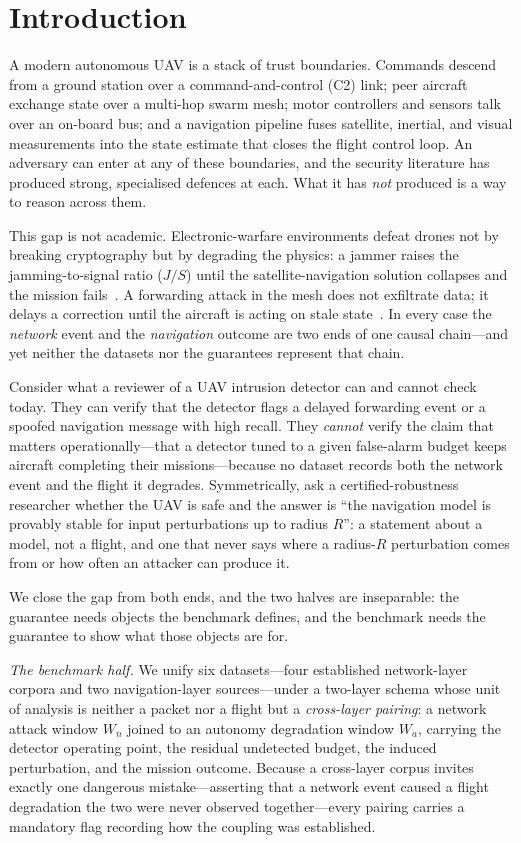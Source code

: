 \section{Introduction}
\label{sec:intro}
A modern autonomous UAV is a stack of trust boundaries. Commands descend from a
ground station over a command-and-control (C2) link; peer aircraft exchange
state over a multi-hop swarm mesh; motor controllers and sensors talk over an
on-board bus; and a navigation pipeline fuses satellite, inertial, and visual
measurements into the state estimate that closes the flight control loop. An
adversary can enter at any of these boundaries, and the security literature has
produced strong, specialised defences at each. What it has \emph{not} produced
is a way to reason across them.

This gap is not academic. Electronic-warfare environments defeat drones not by
breaking cryptography but by degrading the physics: a jammer raises the
jamming-to-signal ratio ($J/S$) until the satellite-navigation solution
collapses and the mission fails~\cite{kassas2022jammer}. A forwarding attack in
the mesh does not exfiltrate data; it delays a correction until the aircraft is
acting on stale state~\cite{datamut2026,lou2019timedelay}. In every case the
\emph{network} event and the \emph{navigation} outcome are two ends of one
causal chain---and yet neither the datasets nor the guarantees represent that
chain.

Consider what a reviewer of a UAV intrusion detector can and cannot check today.
They can verify that the detector flags a delayed forwarding event or a spoofed
navigation message with high recall. They \emph{cannot} verify the claim that
matters operationally---that a detector tuned to a given false-alarm budget
keeps aircraft completing their missions---because no dataset records both the
network event and the flight it degrades. Symmetrically, ask a
certified-robustness researcher whether the UAV is safe and the answer is ``the
navigation model is provably stable for input perturbations up to radius $R$'':
a statement about a model, not a flight, and one that never says where a
radius-$R$ perturbation comes from or how often an attacker can produce it.

We close the gap from both ends, and the two halves are inseparable: the
guarantee needs objects the benchmark defines, and the benchmark needs the
guarantee to show what those objects are for.

\emph{The benchmark half.} We unify six datasets---four established
network-layer corpora and two navigation-layer sources---under a two-layer
schema whose unit of analysis is neither a packet nor a flight but a
\emph{cross-layer pairing}: a network attack window $W_n$ joined to an autonomy
degradation window $W_a$, carrying the detector operating point, the residual
undetected budget, the induced perturbation, and the mission outcome. Because a
cross-layer corpus invites exactly one dangerous mistake---asserting that a
network event caused a flight degradation the two were never observed
together---every pairing carries a mandatory  flag
recording how the coupling was established.

